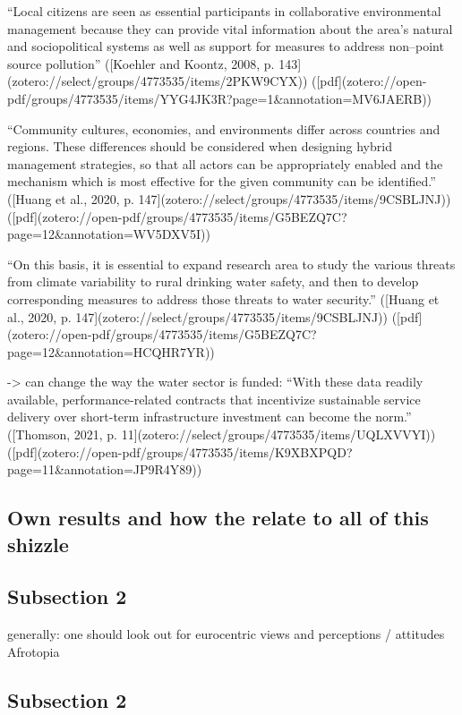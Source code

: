 “Local citizens are seen as essential participants in collaborative environmental management because they can provide vital information about the area’s natural and sociopolitical systems as well as support for measures to address non–point source pollution” ([Koehler and Koontz, 2008, p. 143](zotero://select/groups/4773535/items/2PKW9CYX)) ([pdf](zotero://open-pdf/groups/4773535/items/YYG4JK3R?page=1&annotation=MV6JAERB))


“Community cultures, economies, and environments differ across countries and regions. These differences should be considered when designing hybrid management strategies, so that all actors can be appropriately enabled and the mechanism which is most effective for the given community can be identified.” ([Huang et al., 2020, p. 147](zotero://select/groups/4773535/items/9CSBLJNJ)) ([pdf](zotero://open-pdf/groups/4773535/items/G5BEZQ7C?page=12&annotation=WV5DXV5I))

“On this basis, it is essential to expand research area to study the various threats from climate variability to rural drinking water safety, and then to develop corresponding measures to address those threats to water security.” ([Huang et al., 2020, p. 147](zotero://select/groups/4773535/items/9CSBLJNJ)) ([pdf](zotero://open-pdf/groups/4773535/items/G5BEZQ7C?page=12&annotation=HCQHR7YR))

-> can change the way the water sector is funded: “With these data readily available, performance-related contracts that incentivize sustainable service delivery over short-term infrastructure investment can become the norm.” ([Thomson, 2021, p. 11](zotero://select/groups/4773535/items/UQLXVVYI)) ([pdf](zotero://open-pdf/groups/4773535/items/K9XBXPQD?page=11&annotation=JP9R4Y89))


\subsection{Own results and how the relate to all of this shizzle}


\subsection{Subsection 2}

generally: one should look out for eurocentric views and perceptions / attitudes
Afrotopia

\subsection{Subsection 2}

